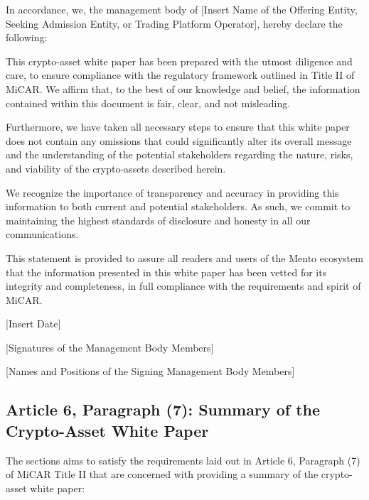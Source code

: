 \documentclass[a4paper]{article}
\theoremstyle{definition}
\begin{document}
\begin{appendices}
In accordance, we, the management body of [Insert Name of the Offering Entity, Seeking Admission Entity, or Trading Platform Operator], hereby declare the following:

This crypto-asset white paper has been prepared with the utmost diligence and care, to ensure compliance with the regulatory framework outlined in Title II of MiCAR. We affirm that, to the best of our knowledge and belief, the information contained within this document is fair, clear, and not misleading. 

Furthermore, we have taken all necessary steps to ensure that this white paper does not contain any omissions that could significantly alter its overall message and the understanding of the potential stakeholders regarding the nature, risks, and viability of the crypto-assets described herein.

We recognize the importance of transparency and accuracy in providing this information to both current and potential stakeholders. As such, we commit to maintaining the highest standards of disclosure and honesty in all our communications. 

This statement is provided to assure all readers and users of the Mento ecosystem that the information presented in this white paper has been vetted for its integrity and completeness, in full compliance with the requirements and spirit of MiCAR.

[Insert Date]

[Signatures of the Management Body Members]

[Names and Positions of the Signing Management Body Members]

\subsection{Article 6, Paragraph (7): Summary of the Crypto-Asset White Paper}
The sections aims to satisfy the requirements laid out in Article 6, Paragraph (7) of MiCAR Title II that are concerned with providing a summary of the crypto-asset white paper:


\end{appendices}
\end{document}
